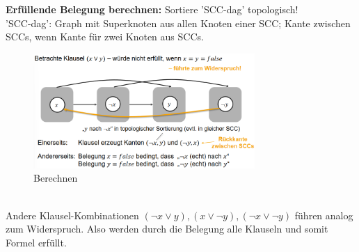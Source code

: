 \documentclass{article}
\begin{document}
                \textbf{Erfüllende Belegung berechnen:} Sortiere 'SCC-dag' topologisch!\\
                'SCC-dag': Graph mit Superknoten aus allen Knoten einer SCC; Kante zwischen SCCs, wenn Kante für zwei Knoten aus SCCs.\\
                \begin{figure}[ht]
                    \centering
                    \includegraphics[width=0.75\textwidth]{Bilder/ErfBelber.png}
                    \caption{Berechnen}
                    \label{fig:ErfBelber}
                \end{figure}\\
                Andere Klausel-Kombinationen $(\lnot x \vee y), (x \vee \lnot y), (\lnot x \vee \lnot y)$ führen analog zum Widerspruch. Also werden durch die Belegung alle Klauseln und somit Formel erfüllt.\\
\end{document}
